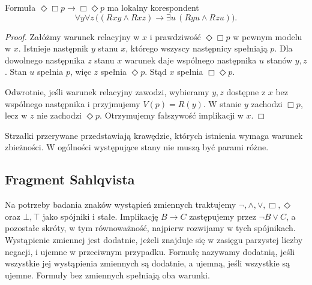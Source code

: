 \begin{twierdzenie}
\label{thm:ncl-kripke-confluence-correspondence}
Formuła $\Diamond\Box p\to\Box\Diamond p$
ma lokalny korespondent
\[
 \forall y\forall z\,
 \bigl((Rxy\wedge Rxz)\to
       \exists u\,(Ryu\wedge Rzu)\bigr).
\]
\end{twierdzenie}
\begin{proof}
Załóżmy warunek relacyjny w $x$ i prawdziwość
$\Diamond\Box p$ w pewnym modelu w $x$.
Istnieje następnik $y$ stanu $x$, którego
wszyscy następnicy spełniają $p$.
Dla dowolnego następnika $z$ stanu $x$
warunek daje wspólnego następnika $u$
stanów $y,z$. Stan $u$ spełnia $p$,
więc $z$ spełnia $\Diamond p$. Stąd
$x$ spełnia $\Box\Diamond p$.

Odwrotnie, jeśli warunek relacyjny zawodzi,
wybieramy $y,z$ dostępne z $x$ bez wspólnego
następnika i przyjmujemy $V(p)=R(y)$.
W stanie $y$ zachodzi $\Box p$, lecz w $z$
nie zachodzi $\Diamond p$. Otrzymujemy
fałszywość implikacji w $x$.
\end{proof}
\begin{center}
\end{center}
Strzałki przerywane przedstawiają krawędzie,
których istnienia wymaga warunek zbieżności.
W ogólności występujące stany nie muszą
być parami różne.

\subsection{Fragment Sahlqvista}

\begin{definicja}
\label{def:ncl-kripke-polarity}
Na potrzeby badania znaków wystąpień zmiennych
traktujemy $\neg,\wedge,\vee,\Box,\Diamond$
oraz $\bot,\top$ jako spójniki i stałe.
Implikację $B\to C$ zastępujemy przez
$\neg B\vee C$, a pozostałe skróty,
w tym równoważność, najpierw rozwijamy
w tych spójnikach.
Wystąpienie zmiennej jest dodatnie, jeżeli
znajduje się w zasięgu parzystej liczby
negacji, i ujemne w przeciwnym przypadku.
Formułę nazywamy dodatnią, jeśli wszystkie
jej wystąpienia zmiennych są dodatnie,
a ujemną, jeśli wszystkie są ujemne.
Formuły bez zmiennych spełniają oba warunki.
\end{definicja}

